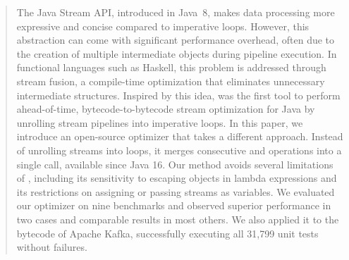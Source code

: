 
\begin{abstract}

The Java Stream API, introduced in Java~8, makes data processing more expressive and concise compared to imperative loops.
However, this abstraction can come with significant performance overhead, often due to the creation of multiple intermediate objects during pipeline execution.
In functional languages such as Haskell, this problem is addressed through stream fusion, a compile-time optimization that eliminates unnecessary intermediate structures.
Inspired by this idea, \streamliner{} was the first tool to perform ahead-of-time, bytecode-to-bytecode stream optimization for Java by unrolling stream pipelines into imperative loops.
%
In this paper, we introduce an open-source optimizer that takes a different approach.
Instead of unrolling streams into loops, it merges consecutive  and  operations into a single  call, available since Java 16.
Our method avoids several limitations of \streamliner{}, including its sensitivity to escaping objects in lambda expressions and its restrictions on assigning or passing streams as variables.
%
We evaluated our optimizer on nine benchmarks and observed superior performance in two cases and comparable results in most others.
We also applied it to the bytecode of Apache Kafka, successfully executing all 31,799 unit tests without failures.

\end{abstract}
